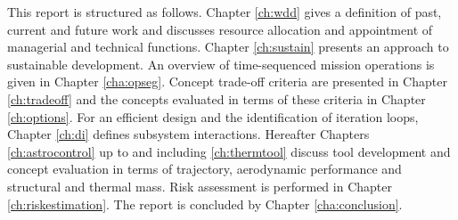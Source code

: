 This report is structured as follows. Chapter \ref{ch:wdd} gives a definition of past, current and future work and discusses resource allocation and appointment of managerial and technical functions. Chapter \ref{ch:sustain} presents an approach to sustainable development. An overview of time-sequenced mission operations is given in Chapter \ref{cha:opseg}. Concept trade-off criteria are presented in Chapter \ref{ch:tradeoff} and the concepts evaluated in terms of these criteria in Chapter \ref{ch:options}. For an efficient design and the identification of iteration loops, Chapter \ref{ch:di} defines subsystem interactions. Hereafter Chapters \ref{ch:astrocontrol} up to and including \ref{ch:thermtool} discuss tool development and concept evaluation in terms of trajectory, aerodynamic performance and structural and thermal mass. Risk assessment is performed in Chapter \ref{ch:riskestimation}. The report is concluded by Chapter \ref{cha:conclusion}.





